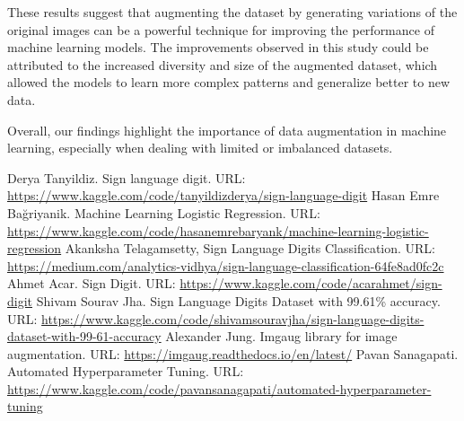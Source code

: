 \documentclass[conference]{IEEEtran}
\begin{document}
These results suggest that augmenting the dataset by generating variations of the original images can be a powerful technique for improving the performance of machine learning models. The improvements observed in this study could be attributed to the increased diversity and size of the augmented dataset, which allowed the models to learn more complex patterns and generalize better to new data.

Overall, our findings highlight the importance of data augmentation in machine learning, especially when dealing with limited or imbalanced datasets.


\begin{thebibliography}{00}
     Derya Tanyildiz. Sign language digit. URL: \url{https://www.kaggle.com/code/tanyildizderya/sign-language-digit}
     Hasan Emre Bağriyanik. Machine Learning Logistic Regression. URL: \url{https://www.kaggle.com/code/hasanemrebaryank/machine-learning-logistic-regression}
     Akanksha Telagamsetty, Sign Language Digits Classification. URL: \url{https://medium.com/analytics-vidhya/sign-language-classification-64fe8ad0fc2c}
     Ahmet Acar. Sign Digit. URL: \url{https://www.kaggle.com/code/acarahmet/sign-digit}
     Shivam Sourav Jha. Sign Language Digits Dataset with 99.61\% accuracy. URL: \url{https://www.kaggle.com/code/shivamsouravjha/sign-language-digits-dataset-with-99-61-accuracy}
     Alexander Jung. Imgaug library for image augmentation. URL: \url{https://imgaug.readthedocs.io/en/latest/}
     Pavan Sanagapati. Automated Hyperparameter Tuning. URL: \url{https://www.kaggle.com/code/pavansanagapati/automated-hyperparameter-tuning}
\end{thebibliography}
\end{document}
